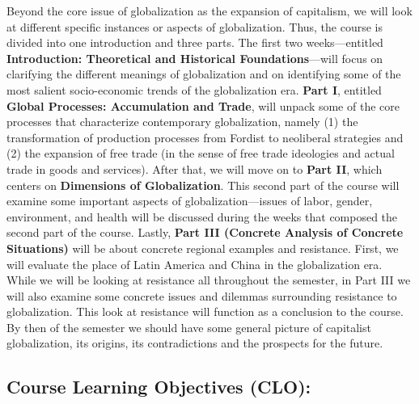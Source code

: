 \documentclass[11pt,]{article}
\begin{document}
Beyond the core issue of globalization as the expansion of capitalism,
we will look at different specific instances or aspects of
globalization. Thus, the course is divided into one introduction and
three parts. The first two weeks---entitled \textbf{Introduction:
Theoretical and Historical Foundations}---will focus on clarifying the
different meanings of globalization and on identifying some of the most
salient socio-economic trends of the globalization era. \textbf{Part I},
entitled \textbf{Global Processes: Accumulation and Trade}, will unpack
some of the core processes that characterize contemporary globalization,
namely (1) the transformation of production processes from Fordist to
neoliberal strategies and (2) the expansion of free trade (in the sense
of free trade ideologies and actual trade in goods and services). After
that, we will move on to \textbf{Part II}, which centers on
\textbf{Dimensions of Globalization}. This second part of the course
will examine some important aspects of globalization---issues of labor,
gender, environment, and health will be discussed during the weeks that
composed the second part of the course. Lastly, \textbf{Part III
(Concrete Analysis of Concrete Situations)} will be about concrete
regional examples and resistance. First, we will evaluate the place of
Latin America and China in the globalization era. While we will be
looking at resistance all throughout the semester, in Part III we will
also examine some concrete issues and dilemmas surrounding resistance to
globalization. This look at resistance will function as a conclusion to
the course. By then of the semester we should have some general picture
of capitalist globalization, its origins, its contradictions and the
prospects for the future.

\hypertarget{course-learning-objectives-clo}{%
\subsection{Course Learning Objectives
(CLO):}\label{course-learning-objectives-clo}}
\end{document}
